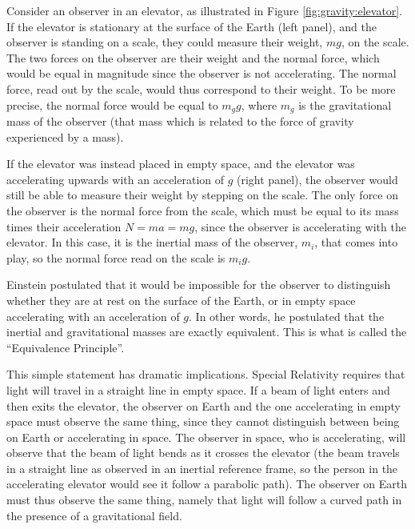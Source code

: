 Consider an observer in an elevator, as illustrated in Figure \ref{fig:gravity:elevator}. If the elevator is stationary at the surface of the Earth (left panel), and the observer is standing on a scale, they could measure their weight, $mg$, on the scale. The two forces on the observer are their weight and the normal force, which would be equal in magnitude since the observer is not accelerating. The normal force, read out by the scale, would thus correspond to their weight. To be more precise, the normal force would be equal to $m_gg$, where $m_g$ is the gravitational mass of the observer (that mass which is related to the force of gravity experienced by a mass).

If the elevator was instead placed in empty space, and the elevator was accelerating upwards with an acceleration of $g$ (right panel), the observer would still be able to measure their weight by stepping on the scale. The only force on the observer is the normal force from the scale, which must be equal to its mass times their acceleration $N=ma=mg$, since the observer is accelerating with the elevator. In this case, it is the inertial mass of the observer, $m_i$, that comes into play, so the normal force read on the scale is $m_ig$.  



Einstein postulated that it would be impossible for the observer to distinguish whether they are at rest on the surface of the Earth, or in empty space accelerating with an acceleration of $g$. In other words, he postulated that the inertial and gravitational masses are exactly equivalent. This is what is called the ``Equivalence Principle''.

This simple statement has dramatic implications. Special Relativity requires that light will travel in a straight line in empty space. If a beam of light enters and then exits the elevator, the observer on Earth and the one accelerating in empty space must observe the same thing, since they cannot distinguish between being on Earth or accelerating in space. The observer in space, who is accelerating, will observe that the beam of light bends as it crosses the elevator (the beam travels in a straight line as observed in an inertial reference frame, so the person in the accelerating elevator would see it follow a parabolic path). The observer on Earth must thus observe the same thing, namely that light will follow a curved path in the presence of a gravitational field.

